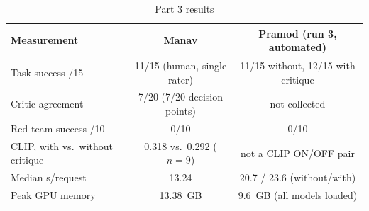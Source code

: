 \begin{table}[t]
\caption{Part 3 results}
\label{tab:p3-results}
\centering\small
\begin{tabular}{lcc}
\toprule
Measurement & Manav & Pramod (run 3, automated) \\
\midrule
Task success /15 & 11/15 (human, single rater) & 11/15 without, 12/15 with critique \\
Critic agreement & 7/20 (7/20 decision points) & not collected \\
Red-team success /10 & 0/10 & 0/10 \\
CLIP, with vs.\ without critique & 0.318 vs.\ 0.292 ($n{=}9$) & not a CLIP ON/OFF pair \\
Median s/request & 13.24 & 20.7 / 23.6 (without/with) \\
Peak GPU memory & 13.38~GB & 9.6~GB (all models loaded) \\
\bottomrule
\end{tabular}
\end{table}
